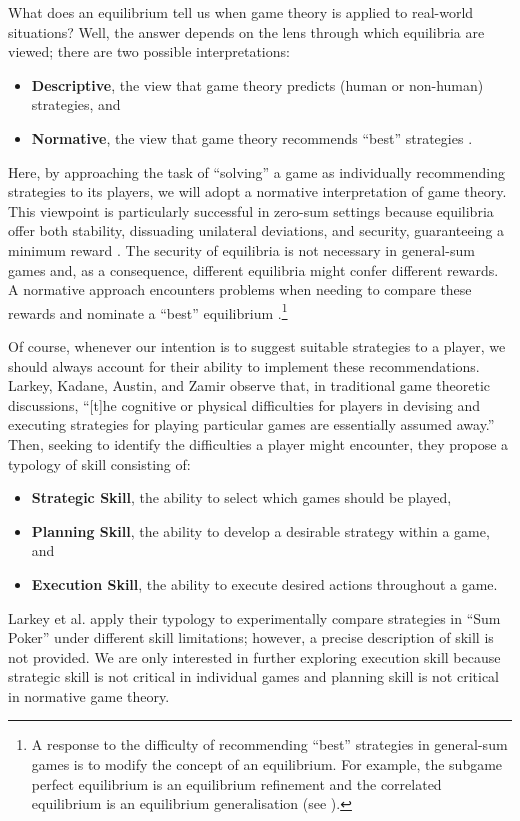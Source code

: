     What does an equilibrium tell us when game theory is applied to real-world situations?
    Well, the answer depends on the lens through which equilibria are viewed; there are two possible interpretations:
    \begin{itemize}
        \item \textbf{Descriptive}, the view that game theory predicts (human or non-human) strategies, and
        \item \textbf{Normative}, the view that game theory recommends ``best'' strategies \parencite{Wooldridge2012}.
    \end{itemize}
    Here, by approaching the task of ``solving'' a game as individually recommending strategies to its players, we will adopt a normative interpretation of game theory.
    This viewpoint is particularly successful in zero-sum settings because equilibria offer both stability, dissuading unilateral deviations, and security, guaranteeing a minimum reward \parencite{Maschler2013}.
    The security of equilibria is not necessary in general-sum games and, as a consequence, different equilibria might confer different rewards.
    A normative approach encounters problems when needing to compare these rewards and nominate a ``best'' equilibrium \parencite{Maschler2013}.\footnote{A
        response to the difficulty of recommending ``best'' strategies in general-sum games is to modify the concept of an equilibrium.
        For example, the subgame perfect equilibrium is an equilibrium refinement and the correlated equilibrium is an equilibrium generalisation (see \parencite[Chapter 7, Chapter 8]{Maschler2013}).
    }

    Of course, whenever our intention is to suggest suitable strategies to a player, we should always account for their ability to implement these recommendations.
    Larkey, Kadane, Austin, and Zamir \parencite{Larkey1997} observe that, in traditional game theoretic discussions, ``[t]he cognitive or physical difficulties for players in devising and executing strategies for playing particular games are essentially assumed away.''
    Then, seeking to identify the difficulties a player might encounter, they propose a typology of skill consisting of:
    \begin{itemize}
        \item \textbf{Strategic Skill}, the ability to select which games should be played,
        \item \textbf{Planning Skill}, the ability to develop a desirable strategy within a game, and
        \item \textbf{Execution Skill}, the ability to execute desired actions throughout a game.
    \end{itemize}
    Larkey et al. \parencite{Larkey1997} apply their typology to experimentally compare strategies in ``Sum Poker'' under different skill limitations; however, a precise description of skill is not provided.
    We are only interested in further exploring execution skill because strategic skill is not critical in individual games and planning skill is not critical in normative game theory.

